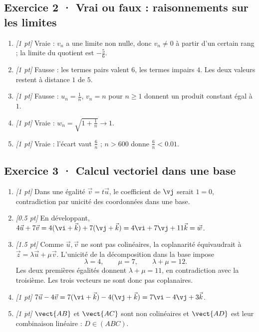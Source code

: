 \subsection*{Exercice 2 · Vrai ou faux : raisonnements sur les limites}\begin{enumerate}

\item \textit{[1 pt]} Vraie : $v_n$ a une limite non nulle, donc $v_n\ne0$ à partir d'un certain rang ; la limite du quotient est $-\frac{5}{6}$.

\item \textit{[1 pt]} Fausse : les termes pairs valent $6$, les termes impairs $4$. Les deux valeurs restent à distance $1$ de $5$.

\item \textit{[1 pt]} Fausse : $u_n=\frac{1}{n}$, $v_n=n$ pour $n\ge1$ donnent un produit constant égal à $1$.

\item \textit{[1 pt]} Vraie : $w_n=\sqrt{1+\frac{1}{n}}\to1$.

\item \textit{[1 pt]} Vraie : l'écart vaut $\frac{6}{n}$ ; $n>600$ donne $\frac{6}{n}<\num{0,01}$.

\end{enumerate}

\subsection*{Exercice 3 · Calcul vectoriel dans une base}\begin{enumerate}

\item \textit{[1 pt]} Dans une égalité $\vec v=t\vec u$, le coefficient de $\vj $ serait $1=0$, contradiction par unicité des coordonnées dans une base.

\item \textit{[\num{0,5} pt]} En développant, $4\vec u+7\vec v=4(\vi +\vec k)+7(\vj +\vec k)=4\vi +7\vj +11\vec k=\vec w$.

\item \textit{[\num{1,5} pt]} Comme $\vec u,\vec v$ ne sont pas colinéaires, la coplanarité équivaudrait à $\vec z=\lambda\vec u+\mu\vec v$. L'unicité de la décomposition dans la base impose
\[\lambda=4,\qquad\mu=7,\qquad\lambda+\mu=12.\]
Les deux premières égalités donnent $\lambda+\mu=11$, en contradiction avec la troisième. Les trois vecteurs ne sont donc pas coplanaires.

\item \textit{[1 pt]} $7\vec u-4\vec v=7(\vi +\vec k)-4(\vj +\vec k)=7\vi -4\vj +3\vec k$.

\item \textit{[1 pt]} $\vect{AB}$ et $\vect{AC}$ sont non colinéaires et $\vect{AD}$ est leur combinaison linéaire : $D\in(ABC)$.

\end{enumerate}

